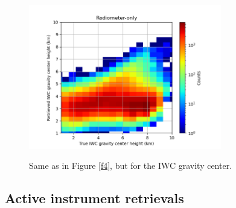\documentclass{ametsocV6.1}
\begin{document}
\begin{figure}[t]
    \centering
    \includegraphics[width=0.75\textwidth,angle=0]{./Figs/fig06.rev.png}\\
    \caption{Same as in Figure \ref{f4}, but for the IWC gravity center.}\label{f6}
\end{figure}

\subsection{Active instrument retrievals}
\end{document}
